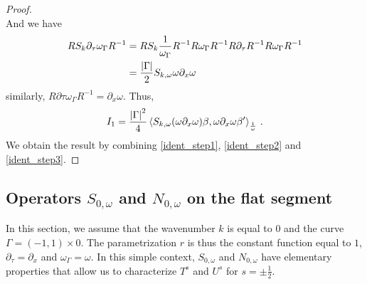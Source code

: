 \documentclass[a4paper]{article}
\begin{document}
\begin{proof}
\begin{equation*}
	\end{equation*}
	And we have 
	\[\begin{split}
	RS_k \partial_\tau \omega_\Gamma R^{-1} &= RS_k\frac{1}{\omega_\Gamma} R^{-1} R \omega_\Gamma R^{-1} R\partial_\tau R^{-1} R \omega_\Gamma R^{-1}\\
	&=  \frac{\left\lvert \Gamma \right\rvert}{2} S_{k,\omega} \omega \partial_x \omega
	\end{split}\]
	similarly, $R\partial\tau \omega_\Gamma R^{-1} = \partial_x \omega $. Thus, 
	\begin{equation}
		I_1 = \frac{\left\lvert \Gamma \right\rvert^2}{4}\left\langle S_{k,\omega}(\omega\partial_x \omega) \beta,\omega \partial_x \omega \beta'\right\rangle_\frac{1}{\omega}\,.
		\label{ident_step3}
	\end{equation}
	 We obtain the result by combining \eqref{ident_step1}, \eqref{ident_step2} and \eqref{ident_step3}. 
\end{proof}
\subsection{Operators $S_{0,\omega}$ and $N_{0,\omega}$ on the flat segment}

In this section, we assume that the wavenumber $k$ is equal to $0$ and the curve $\Gamma = (-1,1)\times{0}$. The parametrization $r$ is thus the constant function equal to $1$, $\partial_\tau = \partial_x$ and $\omega_\Gamma = \omega$. In this simple context, $S_{0,\omega}$ and $N_{0,\omega}$ have elementary properties that allow us to characterize $T^{s}$ and $U^s$ for $s = \pm \frac{1}{2}$. 
\end{document}
